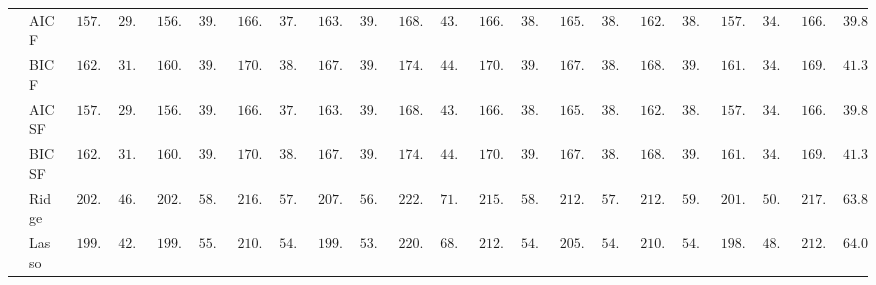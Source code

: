 \begin{tabular}{ll|ll|llllll|llllll|llllll}
 & AIC F  & $\phantom{0}157.50$ & $\phantom{0}29.94$ & $\phantom{0}156.28$ & $\phantom{0}39.28$ & $\phantom{0}166.61$ & $\phantom{0}37.03$ & $\phantom{0}163.85$ & $\phantom{0}39.37$ & $\phantom{0}168.70$ & $\phantom{0}43.02$ & $\phantom{0}166.58$ & $\phantom{0}38.32$ & $\phantom{0}165.18$ & $\phantom{0}38.51$ & $\phantom{0}162.96$ & $\phantom{0}38.24$ & $\phantom{0}157.47$ & $\phantom{0}34.20$ & $\phantom{0}166.48$ & $\phantom{0}39.89$ \\
 & BIC F  & $\phantom{0}162.21$ & $\phantom{0}31.97$ & $\phantom{0}160.18$ & $\phantom{0}39.97$ & $\phantom{0}170.93$ & $\phantom{0}38.16$ & $\phantom{0}167.19$ & $\phantom{0}39.83$ & $\phantom{0}174.00$ & $\phantom{0}44.66$ & $\phantom{0}170.87$ & $\phantom{0}39.53$ & $\phantom{0}167.78$ & $\phantom{0}38.73$ & $\phantom{0}168.10$ & $\phantom{0}39.91$ & $\phantom{0}161.34$ & $\phantom{0}34.88$ & $\phantom{0}169.40$ & $\phantom{0}41.32$ \\
 & AIC SF  & $\phantom{0}157.50$ & $\phantom{0}29.94$ & $\phantom{0}156.28$ & $\phantom{0}39.28$ & $\phantom{0}166.61$ & $\phantom{0}37.03$ & $\phantom{0}163.85$ & $\phantom{0}39.37$ & $\phantom{0}168.70$ & $\phantom{0}43.02$ & $\phantom{0}166.59$ & $\phantom{0}38.30$ & $\phantom{0}165.35$ & $\phantom{0}38.54$ & $\phantom{0}162.98$ & $\phantom{0}38.26$ & $\phantom{0}157.47$ & $\phantom{0}34.20$ & $\phantom{0}166.48$ & $\phantom{0}39.89$ \\
 & BIC SF  & $\phantom{0}162.21$ & $\phantom{0}31.97$ & $\phantom{0}160.18$ & $\phantom{0}39.97$ & $\phantom{0}170.93$ & $\phantom{0}38.16$ & $\phantom{0}167.19$ & $\phantom{0}39.83$ & $\phantom{0}174.00$ & $\phantom{0}44.66$ & $\phantom{0}170.90$ & $\phantom{0}39.55$ & $\phantom{0}167.84$ & $\phantom{0}38.81$ & $\phantom{0}168.10$ & $\phantom{0}39.91$ & $\phantom{0}161.34$ & $\phantom{0}34.88$ & $\phantom{0}169.45$ & $\phantom{0}41.32$ \\
 & Ridge  & $\phantom{0}202.77$ & $\phantom{0}46.62$ & $\phantom{0}202.21$ & $\phantom{0}58.64$ & $\phantom{0}216.45$ & $\phantom{0}57.97$ & $\phantom{0}207.53$ & $\phantom{0}56.20$ & $\phantom{0}222.76$ & $\phantom{0}71.59$ & $\phantom{0}215.96$ & $\phantom{0}58.54$ & $\phantom{0}212.98$ & $\phantom{0}57.10$ & $\phantom{0}212.96$ & $\phantom{0}59.95$ & $\phantom{0}201.79$ & $\phantom{0}50.27$ & $\phantom{0}217.28$ & $\phantom{0}63.89$ \\
 & Lasso  & $\phantom{0}199.78$ & $\phantom{0}42.76$ & $\phantom{0}199.21$ & $\phantom{0}55.75$ & $\phantom{0}210.26$ & $\phantom{0}54.10$ & $\phantom{0}199.86$ & $\phantom{0}53.41$ & $\phantom{0}220.57$ & $\phantom{0}68.39$ & $\phantom{0}212.77$ & $\phantom{0}54.49$ & $\phantom{0}205.36$ & $\phantom{0}54.46$ & $\phantom{0}210.30$ & $\phantom{0}54.81$ & $\phantom{0}198.52$ & $\phantom{0}48.98$ & $\phantom{0}212.73$ & $\phantom{0}64.01$ \\

\end{tabular}
